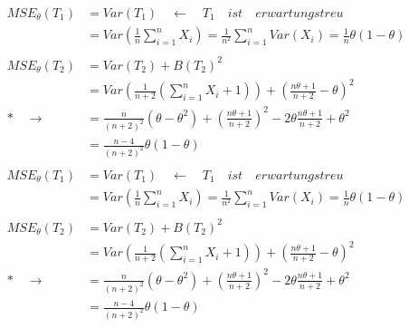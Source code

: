 \documentclass[draft]{article}
\begin{document}
\begin{equation*}
\begin{split}
MSE_\theta(T_1) & = Var(T_1) \quad\leftarrow\quad T_1 \quad ist \quad erwartungstreu \\
& = Var\left(\frac{1}{n}\sum\limits_{i=1}^{n}X_i\right) = \frac{1}{n^2}\sum\limits_{i=1}^{n} Var(X_i) = \frac{1}{n}\theta(1-\theta) \\
\\
MSE_\theta(T_2) & = Var(T_2) + B(T_2)^2 \\
& = Var\left(\frac{1}{n+2}\left(\sum\limits_{i=1}^{n} X_i + 1\right)\right) + \left(\frac{n\theta+1}{n+2}-\theta\right)^2 \\
*\quad\rightarrow\quad& = \frac{n}{(n+2)^2}(\theta-\theta^2) + \left(\frac{n\theta+1}{n+2}\right)^2 - 2\theta\frac{n\theta+1}{n+2} + \theta^2 \\
& = \frac{n-4}{(n+2)^2}\theta(1-\theta) \\
\end{split}
\end{equation*}
\begin{align*}
    MSE_\theta(T_1) & = Var(T_1) \quad\leftarrow\quad T_1 \quad ist \quad erwartungstreu \\
& = Var\left(\frac{1}{n}\sum\limits_{i=1}^{n}X_i\right) = \frac{1}{n^2}\sum\limits_{i=1}^{n} Var(X_i) = \frac{1}{n}\theta(1-\theta) \\
\\
MSE_\theta(T_2) & = Var(T_2) + B(T_2)^2 \\
& = Var\left(\frac{1}{n+2}\left(\sum\limits_{i=1}^{n} X_i + 1\right)\right) + \left(\frac{n\theta+1}{n+2}-\theta\right)^2 \\
*\quad\rightarrow\quad& = \frac{n}{(n+2)^2}(\theta-\theta^2) + \left(\frac{n\theta+1}{n+2}\right)^2 - 2\theta\frac{n\theta+1}{n+2} + \theta^2 \\
& = \frac{n-4}{(n+2)^2}\theta(1-\theta) \\
\end{align*}
\end{document}
